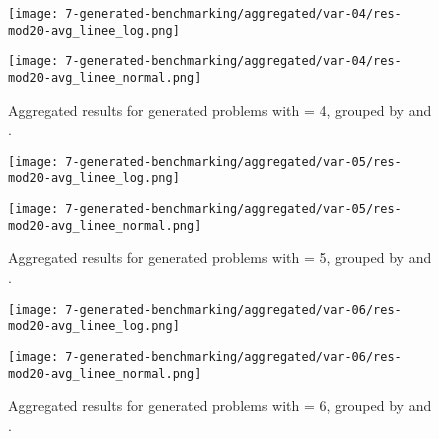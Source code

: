 \begin{appendices}
\begin{figure}[H]
  \centering
  \begin{minipage}{1\textwidth}
    \centering
    \texttt{[image: 7-generated-benchmarking/aggregated/var-04/res-mod20-avg\_linee\_log.png]}
  \end{minipage}
  \hfill
  \begin{minipage}{1\textwidth}
    \centering
    \texttt{[image: 7-generated-benchmarking/aggregated/var-04/res-mod20-avg\_linee\_normal.png]}
  \end{minipage}
  \caption{Aggregated results for generated problems with  = 4, grouped by  and .}\label{fig:app-agg-var4-mod20}
\end{figure}

\begin{figure}[H]
  \centering
  \begin{minipage}{1\textwidth}
    \centering
    \texttt{[image: 7-generated-benchmarking/aggregated/var-05/res-mod20-avg\_linee\_log.png]}
  \end{minipage}
  \hfill
  \begin{minipage}{1\textwidth}
    \centering
    \texttt{[image: 7-generated-benchmarking/aggregated/var-05/res-mod20-avg\_linee\_normal.png]}
  \end{minipage}
  \caption{Aggregated results for generated problems with  = 5, grouped by  and .}\label{fig:app-agg-var5-mod20}
\end{figure}

\begin{figure}[H]
  \centering
  \begin{minipage}{1\textwidth}
    \centering
    \texttt{[image: 7-generated-benchmarking/aggregated/var-06/res-mod20-avg\_linee\_log.png]}
  \end{minipage}
  \hfill
  \begin{minipage}{1\textwidth}
    \centering
    \texttt{[image: 7-generated-benchmarking/aggregated/var-06/res-mod20-avg\_linee\_normal.png]}
  \end{minipage}
  \caption{Aggregated results for generated problems with  = 6, grouped by  and .}\label{fig:app-agg-var6-mod20}
\end{figure}


\end{appendices}
